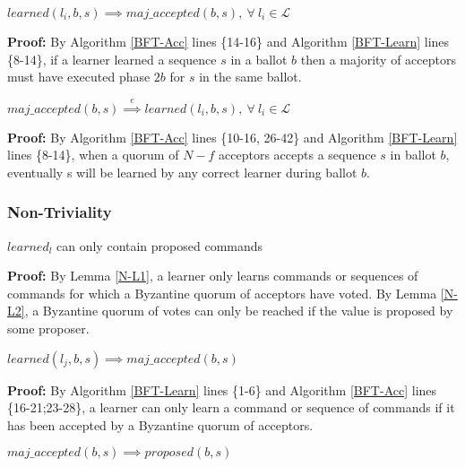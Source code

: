 \begin{lemma}
$learned(l_i,b,s) \implies maj\_accepted(b,s),\ \forall\ l_i \in \mathcal{L} $ \label{C-L1} \par
\end{lemma} 

\textbf{Proof:} By Algorithm \ref{BFT-Acc} lines \{14-16\} and Algorithm \ref{BFT-Learn} lines \{8-14\}, if a learner learned a sequence $s$ in a ballot $b$ then a majority of acceptors must have executed phase $2b$ for $s$ in the same ballot.

\begin{lemma}
$maj\_accepted(b,s) \overset{e}{\implies} learned(l_i,b,s),\ \forall\ l_i \in \mathcal{L}$ \label{C-L2} \par
\end{lemma}
\textbf{Proof:} By Algorithm \ref{BFT-Acc} lines \{10-16, 26-42\} and Algorithm \ref{BFT-Learn} lines \{8-14\}, when a quorum of $N-f$ acceptors accepts a sequence $s$ in ballot $b$, eventually s will be learned by any correct learner during ballot $b$.


\subsubsection{Non-Triviality}
\begin{theorem}
$learned_l$ can only contain proposed commands \label{N-T1} \par
\end{theorem} 

\textbf{Proof:} By Lemma \ref{N-L1}, a learner only learns commands or sequences of commands for which a Byzantine quorum of acceptors have voted. By Lemma \ref{N-L2}, a Byzantine quorum of votes can only be reached if the value is proposed by some proposer.

\begin{lemma}
$learned(l_j,b,s) \implies maj\_accepted(b,s)$ \label{N-L1} \par
\end{lemma}

\textbf{Proof:} By Algorithm \ref{BFT-Learn} lines \{1-6\} and Algorithm \ref{BFT-Acc} lines \{16-21;23-28\}, a learner can only learn a command or sequence of commands if it has been accepted by a Byzantine quorum of acceptors.

\begin{lemma}
$maj\_accepted(b,s) \implies proposed(b,s)$ \label{N-L2} \par
\end{lemma}

